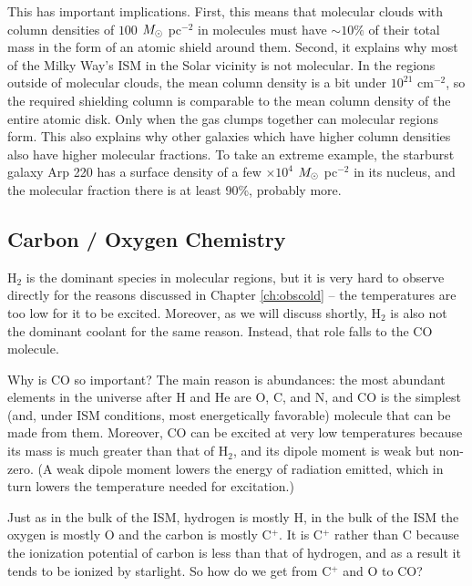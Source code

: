 This has important implications. First, this means that molecular clouds with column densities of $100$ $M_{\odot}$ pc$^{-2}$ in molecules must have $\sim 10\%$ of their total mass in the form of an atomic shield around them. Second, it explains why most of the Milky Way's ISM in the Solar vicinity is not molecular. In the regions outside of molecular clouds, the mean column density is a bit under $10^{21}$ cm$^{-2}$, so the required shielding column is comparable to the mean column density of the entire atomic disk. Only when the gas clumps together can molecular regions form. This also explains why other galaxies which have higher column densities also have higher molecular fractions. To take an extreme example, the starburst galaxy Arp 220 has a surface density of a few $\times 10^4$ $M_{\odot}$ pc$^{-2}$ in its nucleus, and the molecular fraction there is at least 90\%, probably more.

\subsection{Carbon / Oxygen Chemistry}
\label{ssec:cochemistry}

H$_2$ is the dominant species in molecular regions, but it is very hard to observe directly for the reasons discussed in Chapter \ref{ch:obscold} -- the temperatures are too low for it to be excited. Moreover, as we will discuss shortly, H$_2$ is also not the dominant coolant for the same reason. Instead, that role falls to the CO molecule.

Why is CO so important? The main reason is abundances: the most abundant elements in the universe after H and He are O, C, and N, and CO is the simplest (and, under ISM conditions, most energetically favorable) molecule that can be made from them. Moreover, CO can be excited at very low temperatures because its mass is much greater than that of H$_2$, and its dipole moment is weak but non-zero. (A weak dipole moment lowers the energy of radiation emitted, which in turn lowers the temperature needed for excitation.)

Just as in the bulk of the ISM, hydrogen is mostly H, in the bulk of the ISM the oxygen is mostly O and the carbon is mostly C$^+$. It is C$^+$ rather than C because the ionization potential of carbon is less than that of hydrogen, and as a result it tends to be ionized by starlight. So how do we get from C$^+$ and O to CO?

